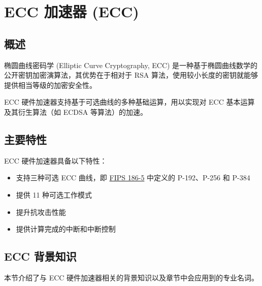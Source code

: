 \documentclass[main\_\_CN.tex]{subfiles}
\begin{document}

\ifglobal
\else
    {\let\clearpage\relax \listoftodos}
    {\let\clearpage\relax \listofdonetodos}
    \tableofcontents
\fi



\hypertarget{ecc}{}
\chapter{ECC 加速器 (ECC)}
\label{mod:ecc}

\section{概述}

椭圆曲线密码学 (Elliptic Curve Cryptography, ECC) 是一种基于椭圆曲线数学的公开密钥加密演算法，其优势在于相对于 RSA 算法，使用较小长度的密钥就能够提供相当等级的加密安全性。

\chipname{} ECC 硬件加速器支持基于可选曲线的多种基础运算，用以实现对 ECC 基本运算及其衍生算法（如 ECDSA 等算法）的加速。

\section{主要特性}

\chipname{} ECC 硬件加速器具备以下特性：

\begin{itemize}
    \item 支持三种可选 ECC 曲线，即 \href{https://nvlpubs.nist.gov/nistpubs/FIPS/NIST.FIPS.186-5.pdf}{FIPS 186-5} 中定义的 P-192、P-256 和 P-384
    \item 提供 11 种可选工作模式
    \item 提升抗攻击性能
    \item 提供计算完成的中断和中断控制
\end{itemize}

\section{ECC 背景知识}

本节介绍了与 ECC 硬件加速器相关的背景知识以及章节中会应用到的专业名词。
\end{document}
